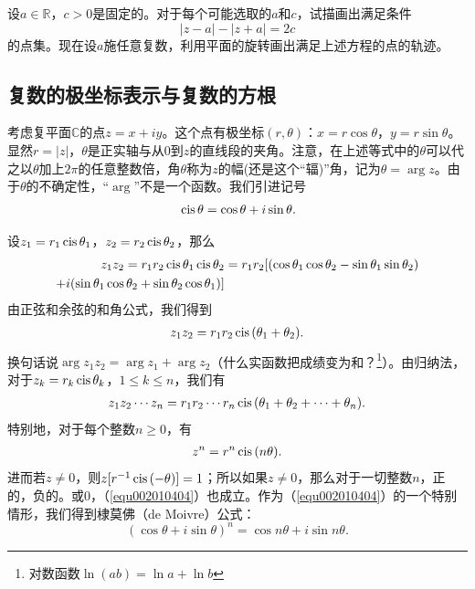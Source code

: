 \begin{exercise}
设$a \in \mathbb{R}$，$c > 0$是固定的。对于每个可能选取的$a$和$c$，试描画出满足条件
\[
|z-a| - |z+a|=2c
\]
的点集。现在设$a$施任意复数，利用平面的旋转画出满足上述方程的点的轨迹。
\end{exercise}

\subsection{复数的极坐标表示与复数的方根}\label{subsection0020104}
考虑复平面$\mathbb{C}$的点$z=x+iy$。这个点有极坐标$(r, \theta)$：$x=r\cos{\theta}$，$y=r\sin{\theta}$。显然$r=|z|$，$\theta$是正实轴与从0到$z$的直线段的夹角。注意，在上述等式中的$\theta$可以代之以$\theta$加上$2\pi$的任意整数倍，角$\theta$称为$z$的幅(还是这个“辐)”角，记为$\theta=\arg{z}$。由于$\theta$的不确定性，“$\arg$”不是一个函数。我们引进记号
\begin{gather}\label{equ002010401}
\,\text{cis}\,{\theta}=\cos{\theta}+i\sin{\theta}.
\end{gather}

设$z_1=r_1\,\text{cis}\,{\theta_1}$，$z_2=r_2\,\text{cis}\,{\theta_2}$，那么
\[
\begin{aligned}
z_1z_2=r_1r_2\,\text{cis}\,{\theta_1}\,\text{cis}\,{\theta_2}&=r_1r_2[(\cos{\theta_1}\cos{\theta_2}-\sin{\theta_1}\sin{}\theta_2)\\
+i(\sin{\theta_1}\cos{\theta_2}+\sin{\theta_2}\cos{\theta_1})]
\end{aligned}
\]
由正弦和余弦的和角公式，我们得到
\begin{gather}\label{equ002010402}
z_1z_2 = r_1r_2\,\text{cis}\,(\theta_1+\theta_2).
\end{gather}
换句话说$\arg{z_1z_2} = \arg{z_1} + \arg{z_2}$（什么实函数把成绩变为和？\footnote{对数函数$\ln{(ab)}=\ln{a}+\ln{b}$}）。由归纳法，对于$z_k=r_k\,\text{cis}\,{\theta_k}$，$1 \le k \le n$，我们有
\begin{gather}\label{equ002010403}
z_1z_2\cdots{}z_n=r_1r_2\cdots{}r_n\,\text{cis}\,{(\theta_1+\theta_2+\cdots+\theta_n)}.
\end{gather}
特别地，对于每个整数$n \ge 0$，有
\begin{gather}\label{equ002010404}
z^n = r^n\,\text{cis}\,(n\theta).
\end{gather}
进而若$z \neq 0$，则$z[r^{-1}\,\text{cis}\,(-\theta)]=1$；所以如果$z \neq 0$，那么对于一切整数$n$，正的，负的。或0，（\ref{equ002010404}）也成立。作为（\ref{equ002010404}）的一个特别情形，我们得到棣莫佛（de Moivre）公式：
\[
(\cos{\theta}+i\sin{\theta})^n=\cos{n\theta} + i\sin{n\theta}.
\]

